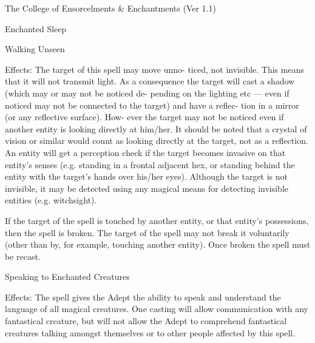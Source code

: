 \begin{Chapter}{The College of Ensorcelments \& Enchantments (Ver 1.1)}
\begin{spell}[G-3]{Enchanted Sleep }
\end{spell}

\begin{spell}[G-4]{Walking Unseen }

Effects:  The  target  of  this  spell  may  move  unno-
ticed,  not  invisible.  This  means  that  it  will  not 
transmit light. As a consequence the target will cast 
a  shadow  (which  may  or  may  not  be  noticed  de-
pending on the lighting etc — even if noticed may 
not  be  connected  to  the  target)  and  have  a  reflec-
tion  in  a  mirror  (or  any  reflective  surface).  How-
ever  the  target  may  not be noticed  even  if  another 
entity  is  looking  directly  at  him/her.  It  should  be 
noted  that  a  crystal  of  vision  or  similar  would 
count  as  looking  directly  at  the  target,  not  as  a 
reflection.  An  entity  will  get  a  perception check if 
the target becomes invasive on that entity’s senses 
(e.g. standing in a frontal adjacent hex, or standing 
behind  the  entity  with  the  target’s  hands  over 
his/her eyes). Although the target is not invisible, it 
may  be  detected  using  any  magical  means  for 
detecting invisible entities (e.g. witchsight). 

If  the  target  of  the  spell  is  touched  by  another 
entity, or that entity’s possessions, then the spell is 
broken.  The  target  of  the  spell  may  not  break  it 
voluntarily  (other  than  by,  for  example,  touching 
another  entity).  Once  broken  the  spell  must  be 
recast. 

\end{spell}

\begin{spell}[G-5]{Speaking to Enchanted Creatures }

Effects:  The  spell  gives  the  Adept  the  ability  to 
speak  and  understand  the  language  of  all  magical 
creatures.  One  casting  will  allow  communication 
with any fantastical creature, but will not allow the 
Adept  to  comprehend  fantastical  creatures  talking 
amongst themselves or to other people affected by 
this spell. 

\end{spell}


\end{Chapter}
